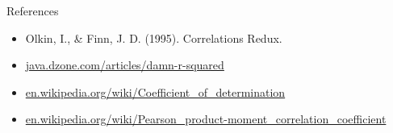 \documentclass[10pt,pdf]{beamer}
\begin{document}

\begin{frame}[t]{References}

\begin{itemize}
  \setlength{\itemsep}{15pt}
  \item Olkin, I., \& Finn, J. D. (1995). Correlations Redux.
  \item \url{java.dzone.com/articles/damn-r-squared}
  \item \url{en.wikipedia.org/wiki/Coefficient_of_determination}
  \item \url{en.wikipedia.org/wiki/Pearson_product-moment_correlation_coefficient}
\end{itemize}

\end{frame}

\end{document}

